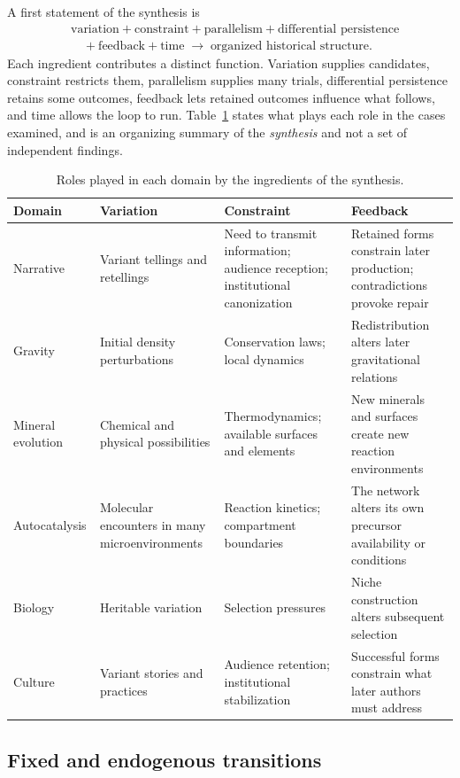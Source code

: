 \documentclass[11pt]{article}
\begin{document}
A first statement of the synthesis is
\begin{align*}
&\text{variation} + \text{constraint} + \text{parallelism} + \text{differential persistence}\\
&\quad + \text{feedback} + \text{time} \;\rightarrow\; \text{organized historical structure}.
\end{align*}
Each ingredient contributes a distinct function. Variation supplies candidates, constraint restricts them, parallelism supplies many trials, differential persistence retains some outcomes, feedback lets retained outcomes influence what follows, and time allows the loop to run. Table~\ref{tab:constraint} states what plays each role in the cases examined, and is an organizing summary of the \emph{synthesis} and not a set of independent findings.

\begin{table}[h]
\centering
\small
\begin{tabular}{p{}p{}p{}p{}}
\hline
Domain & Variation & Constraint & Feedback \\
\hline
Narrative & Variant tellings and retellings & Need to transmit information; audience reception; institutional canonization & Retained forms constrain later production; contradictions provoke repair \\
Gravity & Initial density perturbations & Conservation laws; local dynamics & Redistribution alters later gravitational relations \\
Mineral evolution & Chemical and physical possibilities & Thermodynamics; available surfaces and elements & New minerals and surfaces create new reaction environments \\
Autocatalysis & Molecular encounters in many microenvironments & Reaction kinetics; compartment boundaries & The network alters its own precursor availability or conditions \\
Biology & Heritable variation & Selection pressures & Niche construction alters subsequent selection \\
Culture & Variant stories and practices & Audience retention; institutional stabilization & Successful forms constrain what later authors must address \\
\hline
\end{tabular}
\caption{Roles played in each domain by the ingredients of the synthesis.}
\label{tab:constraint}
\end{table}

\subsection{Fixed and endogenous transitions}
\end{document}
